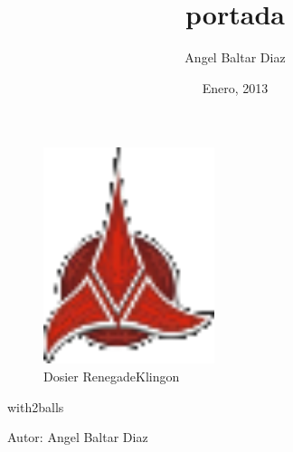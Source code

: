 


\title{portada} 
\author{Angel Baltar Diaz}
\date{\Large Enero, 2013} 

%
\begin{titlepage}
\begin{figure}
\begin{center}
\includegraphics[width=5cm]{includes/images/logo.png}
\\ {\large Dosier RenegadeKlingon}
\\[3cm]
\end{center}
\end{figure}
\begin{center}
{\Large with2balls}

\end{center}
\begin{flushright}
{\large Autor: Angel Baltar Diaz}
\end{flushright}
\end{titlepage}
%